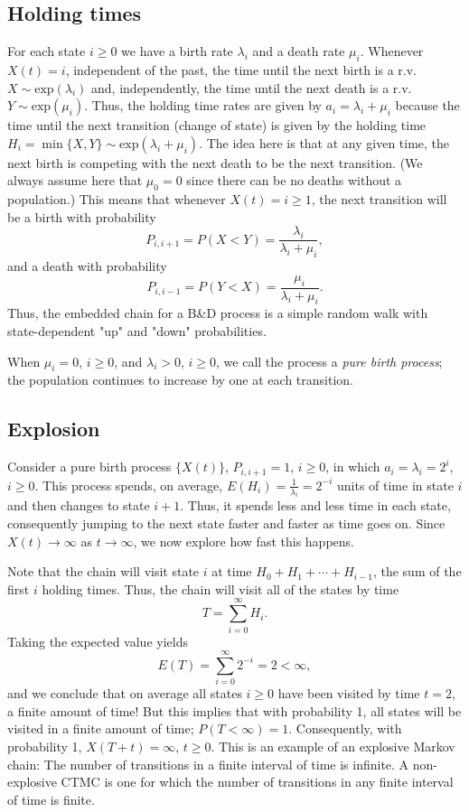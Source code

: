 \documentclass[12pt,a4paper]{article}
\begin{document}
\subsection{Holding times}
For each state $i \geq 0$ we have a birth rate $\lambda_i$ and a death rate $\mu_i$.
Whenever $X(t) = i$, independent of the past, the time until the next birth is a r.v. $X \sim \text{exp}(\lambda_i)$ and, independently, the time until the next death is a r.v. $Y \sim \text{exp}(\mu_i)$. 
Thus, the holding time rates are given by $a_i = \lambda_i + \mu_i$ because the time until the next transition (change of state) is given by the holding time $H_i = \min\{ X, Y \} \sim \text{exp}(\lambda_i + \mu_i)$. 
The idea here is that at any given time, the next birth is competing with the next death to be the next transition. (We always assume here that $\mu_0 = 0$ since there can be no deaths without a population.)
This means that whenever $X(t) = i \geq 1$, the next transition will be a birth with probability
$$
P_{i,i+1} = P(X < Y) = \frac{\lambda_i}{\lambda_i + \mu_i},
$$
and a death with probability
$$
P_{i,i-1} = P(Y < X) = \frac{\mu_i}{\lambda_i + \mu_i}.
$$
Thus, the embedded chain for a B\&D process is a simple random walk with state-dependent "up" and "down" probabilities.

When $\mu_i = 0$, $i \geq 0$, and $\lambda_i > 0$, $i \geq 0$, we call the process a \textit{pure birth process}; the population continues to increase by one at each transition.


\subsection{Explosion}
Consider a pure birth process $\{ X(t) \}$, $P_{i,i+1} = 1$, $i \geq 0$, in which $a_i = \lambda_i = 2^i$, $i \geq 0$. 
This process spends, on average, $E(H_i) = \frac{1}{\lambda_i} = 2^{-i}$ units of time in state $i$ and then changes to state $i + 1$. 
Thus, it spends less and less time in each state, consequently jumping to the next state faster and faster as time goes on. 
Since $X(t) \to \infty$ as $t \to \infty$, we now explore how fast this happens. 

Note that the chain will visit state $i$ at time $H_0 + H_1 + \cdots + H_{i-1}$, the sum of the first $i$ holding times. 
Thus, the chain will visit all of the states by time
$$
T = \sum_{i=0}^{\infty} H_i.
$$
Taking the expected value yields
$$
E(T) = \sum_{i=0}^{\infty} 2^{-i} = 2 < \infty,
$$
and we conclude that on average all states $i \geq 0$ have been visited by time $t = 2$, a finite amount of time! But this implies that with probability 1, all states will be visited in a finite amount of time; $P(T < \infty) = 1$. 
Consequently, with probability 1, $X(T + t) = \infty$, $t \geq 0$. This is an example of an explosive Markov chain: The number of transitions in a finite interval of time is infinite.
A non-explosive CTMC is one for which the number of
transitions in any finite interval of time is finite.
\end{document}
